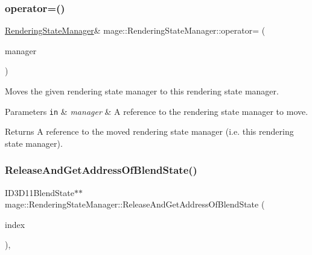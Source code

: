 \subsubsection{\texorpdfstring{operator=()}{operator=()}\hspace{0.1cm}{\footnotesize\ttfamily [2/2]}}
{\footnotesize\ttfamily \hyperlink{classmage_1_1_rendering_state_manager}{Rendering\+State\+Manager}\& mage\+::\+Rendering\+State\+Manager\+::operator= (\begin{DoxyParamCaption}\item[{\hyperlink{classmage_1_1_rendering_state_manager}{Rendering\+State\+Manager} \&\&}]{manager }\end{DoxyParamCaption})\hspace{0.3cm}{\ttfamily [delete]}}

Moves the given rendering state manager to this rendering state manager.


\begin{DoxyParams}[1]{Parameters}
\mbox{\tt in}  & {\em manager} & A reference to the rendering state manager to move. \\
\hline
\end{DoxyParams}
\begin{DoxyReturn}{Returns}
A reference to the moved rendering state manager (i.\+e. this rendering state manager). 
\end{DoxyReturn}
\hypertarget{classmage_1_1_rendering_state_manager_ad7626daab9a488a34ab50df3768d5bc9}{}\label{classmage_1_1_rendering_state_manager_ad7626daab9a488a34ab50df3768d5bc9} 
\subsubsection{\texorpdfstring{Release\+And\+Get\+Address\+Of\+Blend\+State()}{ReleaseAndGetAddressOfBlendState()}}
{\footnotesize\ttfamily I\+D3\+D11\+Blend\+State$\ast$$\ast$ mage\+::\+Rendering\+State\+Manager\+::\+Release\+And\+Get\+Address\+Of\+Blend\+State (\begin{DoxyParamCaption}\item[{\hyperlink{classmage_1_1_rendering_state_manager_ae8ea18eb352ae4cf9e23b41f10578984}{Blend\+State\+Index}}]{index }\end{DoxyParamCaption})\hspace{0.3cm}{\ttfamily [private]}, {\ttfamily [noexcept]}}

